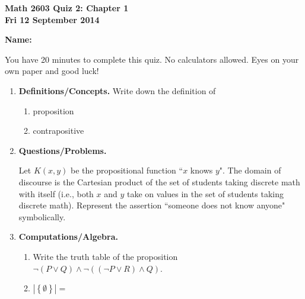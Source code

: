 \documentclass[11pt,letterpaper]{article}
\begin{document}
\flushleft
\begin{multicols}{2}


\begin{large}\textbf{Math 2603 Quiz 2: Chapter 1 \\
Fri 12 September 2014}\end{large}

\textbf{Name:  }\underline{\hspace{35ex}}

\vspace{.5in}

\end{multicols}

\pagestyle{empty}


\flushleft

You have 20 minutes to complete this quiz.  No calculators allowed.  Eyes on your own paper and good luck!

\begin{enumerate}
\item  \textbf{Definitions/Concepts.} Write down the definition of
\begin{enumerate} 
\item proposition 
\vspace{2pc}
\item contrapositive 
\vspace{4pc}
\end{enumerate}

\item \textbf{Questions/Problems.}

Let $K(x,y)$ be the propositional function ``$x$ knows $y$".  The domain of discourse is the Cartesian product of the set of students taking discrete math with itself (i.e., both $x$ and $y$ take on values in the set of students taking discrete math).  Represent the assertion ``someone does not know anyone" symbolically.

\vspace{5pc}
\item \textbf{Computations/Algebra.}
\begin{enumerate}
\item Write the truth table of the proposition $\neg(P\vee Q)\wedge\neg\left((\neg P\vee R)\wedge Q\right)$.
\vspace{18pc}
\item $|\left\{\emptyset\right\}|=$
\vfill
\end{enumerate}

\end{enumerate}
\end{document}
